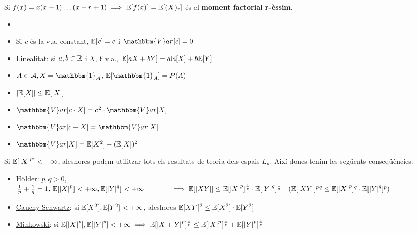\begin{defi}
  Si $f(x) = x(x-1)\ldots(x-r+1) \implies \mathbb{E}[f(x)] = \mathbb{E}[(X)_r]$ és el \textbf{moment factorial r-èssim}.
\end{defi}

\begin{prop}
  \begin{itemize}
      \item []
      \item Si $c$ és la v.a. constant, $\mathbb{E}[c] = c$ i $\mathbbm{V}ar[c] = 0$
      \item \underline{Linealitat}: si $a, b \in \mathbb{R}$ i $X, Y$ v.a., $\mathbb{E}[aX + bY] = a\mathbb{E}[X] + b\mathbb{E}[Y]$
      \item $A \in \mathcal{A}, X = \mathbbm{1}_{A}$, $\E[\mathbbm{1}_{A}] = P(A)$
      \item $\left\vert \mathbb{E}[X] \right\vert \leq \mathbb{E}[\left\vert X \right\vert]$
      \item $\mathbbm{V}ar[c\cdot X] = c^{2}\cdot \mathbbm{V}ar[X]$
      \item $\mathbbm{V}ar[c+X] = \mathbbm{V}ar[X]$
      \item $\mathbbm{V}ar[X] = \E[X^{2}] - (\E[X])^{2}$
  \end{itemize}
\end{prop}

\newpage

\begin{obs}
  Si $\mathbb{E}[\left\vert X \right\vert^{p}] < +\infty$, aleshores podem utilitzar tots els resultats de teoria dels espais 
  $L_{p}$. Així doncs tenim les següents conseqüències:
  
  \begin{itemize}
      \item \underline{Hölder}: $p, q > 0$, $\frac{1}{p} + \frac{1}{q} = 1, \, \mathbb{E}[\left\vert X \right\vert^{p}] < +\infty, 
      \mathbb{E}[\left\vert Y \right\vert^{q}] < +\infty \\ \- \hspace{1.25cm}\implies \mathbb{E}[\left\vert XY \right\vert] \leq \mathbb{E}[\left\vert X \right\vert^{p}]^{\frac{1}{p}}\cdot 
      \mathbb{E}[\left\vert Y \right\vert^{q}]^{\frac{1}{q}} \quad (\mathbb{E}[\left\vert XY \right\vert]^{pq} \leq \mathbb{E}[\left\vert X \right\vert^{p}]^{q}\cdot \mathbb{E}[\left\vert Y \right\vert^{q}]^{p})$
      
      \item \underline{Cauchy-Schwartz}: si $\mathbb{E}[X^{2}], \mathbb{E}[Y^2] < +\infty$, aleshores $\mathbb{E}[XY]^{2} \leq \mathbb{E}[X^{2}]\cdot \mathbb{E}[Y^{2}]$
      \item \underline{Minkowski}: si $\mathbb{E}[\left\vert X \right\vert^{p}], \mathbb{E}[\left\vert Y \right\vert^{p}] < +\infty \implies \mathbb{E}[\left\vert X+Y \right\vert^{p}]^{\frac{1}{p}} 
      \leq \mathbb{E}[\left\vert X \right\vert^{p}]^{\frac{1}{p}} + \mathbb{E}[\left\vert Y \right\vert^{p}]^{\frac{1}{p}}$
  \end{itemize}
\end{obs}


